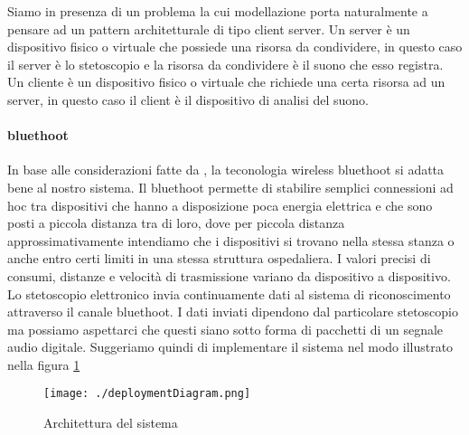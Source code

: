 % 
% 
% 
% 
% 





Siamo in presenza di un problema la cui modellazione porta naturalmente a pensare ad un pattern architetturale di tipo client server. 
Un server \`e un dispositivo fisico o virtuale che possiede una risorsa da condividere\cite{clientServer}, in questo caso il server \`e lo stetoscopio e la risorsa da condividere \`e il suono che esso registra. Un cliente \`e un dispositivo fisico o virtuale che richiede una certa risorsa ad un server\cite{clientServer}, in questo caso il client \`e il dispositivo di analisi del suono.



\paragraph{bluethoot}
In base alle considerazioni fatte da \cite{BBATMBS}, la teconologia wireless bluethoot si adatta bene al nostro sistema. Il bluethoot permette di stabilire semplici connessioni ad hoc tra dispositivi che hanno a disposizione poca energia elettrica e che sono posti a piccola distanza tra di loro, dove per piccola distanza approssimativamente intendiamo che i dispositivi si trovano nella stessa stanza o anche entro certi limiti in una stessa struttura ospedaliera. I valori precisi di consumi, distanze e velocit\`a di trasmissione variano da dispositivo a dispositivo. Lo stetoscopio elettronico invia continuamente dati al sistema di riconoscimento attraverso il canale bluethoot. I dati inviati dipendono dal particolare stetoscopio ma possiamo aspettarci che questi siano sotto forma di pacchetti di un segnale audio digitale. Suggeriamo quindi di implementare il sistema nel modo illustrato nella figura \ref{blueinterfacciastetoscopiominima}
\begin{figure}
 \centering
 \texttt{[image: ./deploymentDiagram.png]}
  \caption{Architettura del sistema}
  \label{blueinterfacciastetoscopiominima}
\end{figure}



